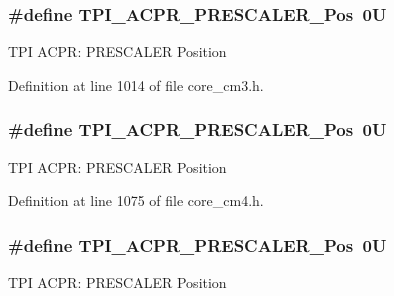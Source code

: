 \subsubsection[{\texorpdfstring{T\+P\+I\+\_\+\+A\+C\+P\+R\+\_\+\+P\+R\+E\+S\+C\+A\+L\+E\+R\+\_\+\+Pos}{TPI_ACPR_PRESCALER_Pos}}]{\setlength{\rightskip}{0pt plus 5cm}\#define T\+P\+I\+\_\+\+A\+C\+P\+R\+\_\+\+P\+R\+E\+S\+C\+A\+L\+E\+R\+\_\+\+Pos~0U}\hypertarget{group___c_m_s_i_s___t_p_i_ga5a82d274eb2df8b0c92dd4ed63535928}{}\label{group___c_m_s_i_s___t_p_i_ga5a82d274eb2df8b0c92dd4ed63535928}
T\+PI A\+C\+PR\+: P\+R\+E\+S\+C\+A\+L\+ER Position 

Definition at line 1014 of file core\+\_\+cm3.\+h.

\subsubsection[{\texorpdfstring{T\+P\+I\+\_\+\+A\+C\+P\+R\+\_\+\+P\+R\+E\+S\+C\+A\+L\+E\+R\+\_\+\+Pos}{TPI_ACPR_PRESCALER_Pos}}]{\setlength{\rightskip}{0pt plus 5cm}\#define T\+P\+I\+\_\+\+A\+C\+P\+R\+\_\+\+P\+R\+E\+S\+C\+A\+L\+E\+R\+\_\+\+Pos~0U}\hypertarget{group___c_m_s_i_s___t_p_i_ga5a82d274eb2df8b0c92dd4ed63535928}{}\label{group___c_m_s_i_s___t_p_i_ga5a82d274eb2df8b0c92dd4ed63535928}
T\+PI A\+C\+PR\+: P\+R\+E\+S\+C\+A\+L\+ER Position 

Definition at line 1075 of file core\+\_\+cm4.\+h.

\subsubsection[{\texorpdfstring{T\+P\+I\+\_\+\+A\+C\+P\+R\+\_\+\+P\+R\+E\+S\+C\+A\+L\+E\+R\+\_\+\+Pos}{TPI_ACPR_PRESCALER_Pos}}]{\setlength{\rightskip}{0pt plus 5cm}\#define T\+P\+I\+\_\+\+A\+C\+P\+R\+\_\+\+P\+R\+E\+S\+C\+A\+L\+E\+R\+\_\+\+Pos~0U}\hypertarget{group___c_m_s_i_s___t_p_i_ga5a82d274eb2df8b0c92dd4ed63535928}{}\label{group___c_m_s_i_s___t_p_i_ga5a82d274eb2df8b0c92dd4ed63535928}
T\+PI A\+C\+PR\+: P\+R\+E\+S\+C\+A\+L\+ER Position 

